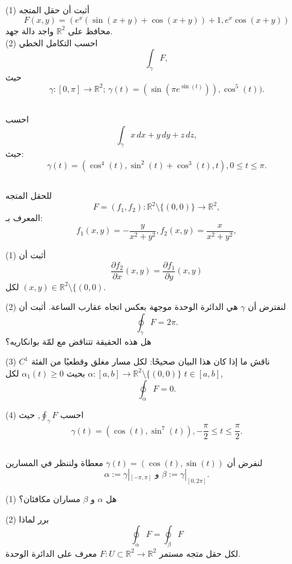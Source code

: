 \subsection{}
(1) أثبت أن حقل المتجه
\[
F(x, y) = \left(e^x(\sin(x + y) + \cos(x + y)) + 1, e^x \cos(x + y) \right)
\]
محافظ على \( \mathbb{R}^2 \) واجد دالة جهد.
\\
(2) احسب التكامل الخطي
\[ \int_{\gamma} F, \]
حيث
\[ \gamma : [0, \pi] \to \mathbb{R}^2;\, \gamma(t) = (\sin(\pi e^{\sin(t)})), \cos^5(t)). \]
\subsection{}
احسب
\[ 
\int_{\gamma} x \, dx + y \, dy + z \, dz, 
\]
حيث:
\[ \gamma(t) = (\cos^4(t), \sin^2(t) + \cos^3(t), t), 0 \leq t \leq \pi. \]

\subsection{}
للحقل المتجه
\[ F = (f_1, f_2) : \mathbb{R}^2 \setminus \{(0, 0)\} \to \mathbb{R}^2, \]
المعرف بـ:
\[ f_1(x, y) = -\frac{y}{x^2 + y^2}, f_2(x, y) = \frac{x}{x^2 + y^2}, \]

(1) أثبت أن
\[ \frac{\partial f_2}{\partial x}(x, y) = \frac{\partial f_1}{\partial y}(x, y) \]
لكل \( (x, y) \in \mathbb{R}^2 \setminus \{(0, 0)\).

(2) لنفترض أن \( \gamma \) هي الدائرة الوحدة موجهة بعكس اتجاه عقارب الساعة. أثبت أن
\[ \oint_{\gamma} F = 2\pi. \]
هل هذه الحقيقة تتناقض مع لمّة بوانكاريه؟

(3) ناقش ما إذا كان هذا البيان صحيحًا: لكل مسار مغلق وقطعيًا من الفئة \( C^1 \) \( \alpha : [a, b] \to \mathbb{R}^2 \setminus \{(0, 0)\} \) بحيث \( \alpha_1(t) \geq 0 \) لكل \( t \in [a, b] \),
\[ \oint_{\alpha} F = 0. \]

(4) احسب \( \oint_{\gamma} F \), حيث
\[ \gamma(t) = (\cos(t), \sin^7(t)), -\frac{\pi}{2} \leq t \leq \frac{\pi}{2}. \]
\subsection{}
لنفرض أن \( \gamma(t) = (\cos(t), \sin(t)) \) معطاة ولننظر في المسارين
\[ \alpha := \gamma|_{[-\pi, \pi]} \text{ و } \beta := \gamma|_{[0, 2\pi]}. \]

(1) هل \( \alpha \) و \( \beta \) مساران مكافئان؟

(2) برر لماذا
\[ \oint_{\alpha} F = \oint_{\beta} F \]
لكل حقل متجه مستمر \( F : U \subset \mathbb{R}^2 \to \mathbb{R}^2 \) معرف على الدائرة الوحدة.
